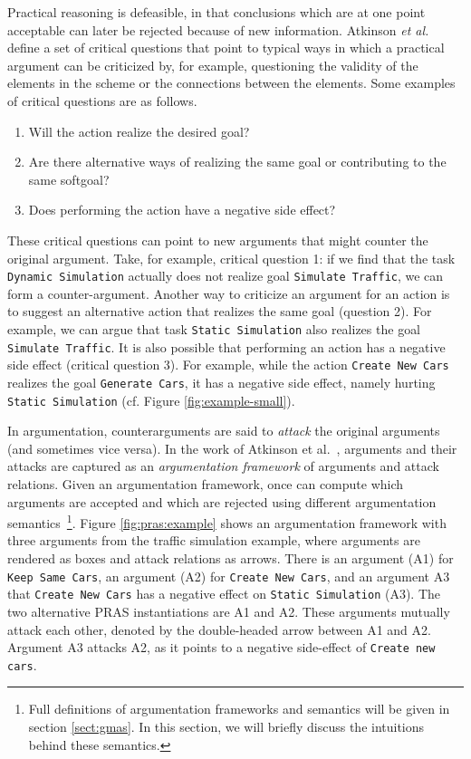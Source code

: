 Practical reasoning is defeasible, in that conclusions which are at one point acceptable can later be rejected because of new information. Atkinson \emph{et al.}~\cite{atkinson2007} define a set of critical questions that point to typical ways in which a practical argument can be criticized by, for example, questioning the validity of the elements in the scheme or the connections between the elements. Some examples of critical questions are as follows.

\begin{enumerate}
\item Will the action realize the desired goal?
\item Are there alternative ways of realizing the same goal or contributing to the same softgoal?
\item Does performing the action have a negative side effect?
\end{enumerate}

These critical questions can point to new arguments that might counter the original argument. Take, for example, critical question 1: if we find that the task \texttt{Dynamic Simulation} actually does not realize goal \texttt{Simulate Traffic}, we can form a counter-argument. Another way to criticize an argument for an action is to suggest an alternative action that realizes the same goal (question 2). For example, we can argue that task \texttt{Static Simulation} also realizes the goal \texttt{Simulate Traffic}. It is also possible that performing an action has a negative side effect (critical question 3). For example, while the action \texttt{Create New Cars} realizes the goal \texttt{Generate Cars}, it has a negative side effect, namely hurting \texttt{Static Simulation} (cf. Figure \ref{fig:example-small}).

In argumentation, counterarguments are said to \emph{attack} the original arguments (and sometimes vice versa). In the work of Atkinson et al.~\cite{atkinson2007}, arguments and their attacks are captured as an \emph{argumentation framework} of arguments and attack relations. Given an argumentation framework, once can compute which arguments are accepted and which are rejected using different argumentation semantics~\cite{Dung1995}\footnote{Full definitions of argumentation frameworks and semantics will be given in section \ref{sect:gmas}. In this section, we will briefly discuss the intuitions behind these semantics.}. Figure \ref{fig:pras:example} shows an argumentation framework with three arguments from the traffic simulation example, where arguments are rendered as boxes and attack relations as arrows. There is an argument (A1) for \texttt{Keep Same Cars}, an argument (A2) for \texttt{Create New Cars}, and an argument A3 that \texttt{Create New Cars} has a negative effect on \texttt{Static Simulation} (A3). The two alternative PRAS instantiations are A1 and A2. These arguments mutually attack each other, denoted by the double-headed arrow between A1 and A2. Argument A3 attacks A2, as it points to a negative side-effect of \texttt{Create new cars}. 

